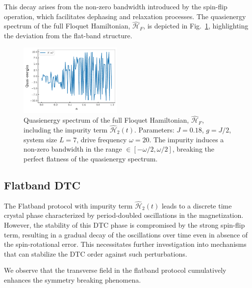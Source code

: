 \documentclass[a4paper,10pt]{article}
\begin{document}
This decay arises from the non-zero bandwidth introduced by the spin-flip operation, which facilitates dephasing and relaxation processes. The quasienergy spectrum of the full Floquet Hamiltonian, $\hat{\mathcal{H}}_F$, is depicted in Fig.~\ref{figs:impure_flatband_qe}, highlighting the deviation from the flat-band structure.
\begin{figure}[h!]
    \centering
    \includegraphics[width=0.45\textwidth]{figs/impure_flatband_qe.pdf}
    \caption{Quasienergy spectrum of the full Floquet Hamiltonian, $\hat{\mathcal{H}}_F$, including the impurity term $\hat{\mathcal{H}}_2(t)$. Parameters: $J=0.18$, $g=J/2$, system size $L=7$, drive frequency $\omega=20$. The impurity induces a non-zero bandwidth in the range $\in[-\omega/2 , \omega/2]$, breaking the perfect flatness of the quasienergy spectrum.}
    \label{figs:impure_flatband_qe}
\end{figure}

\subsection{Flatband DTC}
The Flatband protocol with impurity term $\hat{\mathcal{H}}_2(t)$ leads to a discrete time crystal phase characterized by period-doubled oscillations in the magnetization. However, the stability of this DTC phase is compromised by the strong spin-flip term, resulting in a gradual decay of the oscillations over time even in absence of the spin-rotational error. This necessitates further investigation into mechanisms that can stabilize the DTC order against such perturbations. 

We observe that the transverse field in the flatband protocol cumulatively enhances the symmetry breaking phenomena.


\printbibliography{}
\end{document}
